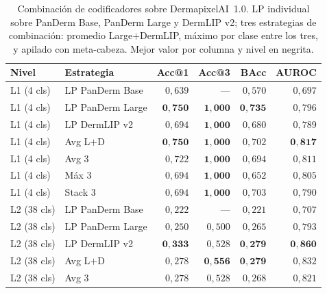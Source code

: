 \begin{table}[htbp]
\centering
\footnotesize
\setlength{\tabcolsep}{4pt}
\renewcommand{\arraystretch}{0.95}
\caption{Combinación de codificadores sobre DermapixelAI~1.0. LP
individual sobre PanDerm Base, PanDerm Large y DermLIP v2; tres
estrategias de combinación: promedio Large$+$DermLIP, máximo por
clase entre los tres, y apilado con meta-cabeza. Mejor valor por
columna y nivel en negrita.}
\label{tab:dermapixel-ensemble}
\begin{tabular}{llrrrr}
\hline
Nivel & Estrategia                         & Acc@1              & Acc@3              & BAcc               & AUROC \\
\hline
L1 (4 cls)   & LP PanDerm Base             & $0{,}639$          & ---                & $0{,}570$          & $0{,}697$ \\
L1 (4 cls)   & LP PanDerm Large            & $\mathbf{0{,}750}$ & $\mathbf{1{,}000}$ & $\mathbf{0{,}735}$ & $0{,}796$ \\
L1 (4 cls)   & LP DermLIP v2               & $0{,}694$          & $\mathbf{1{,}000}$ & $0{,}680$          & $0{,}789$ \\
L1 (4 cls)   & Avg L$+$D                   & $\mathbf{0{,}750}$ & $\mathbf{1{,}000}$ & $0{,}702$          & $\mathbf{0{,}817}$ \\
L1 (4 cls)   & Avg 3                       & $0{,}722$          & $\mathbf{1{,}000}$ & $0{,}694$          & $0{,}811$ \\
L1 (4 cls)   & Máx 3                       & $0{,}694$          & $\mathbf{1{,}000}$ & $0{,}652$          & $0{,}805$ \\
L1 (4 cls)   & Stack 3                     & $0{,}694$          & $\mathbf{1{,}000}$ & $0{,}703$          & $0{,}790$ \\
\hline
L2 (38 cls)  & LP PanDerm Base             & $0{,}222$          & ---                & $0{,}221$          & $0{,}707$ \\
L2 (38 cls)  & LP PanDerm Large            & $0{,}250$          & $0{,}500$          & $0{,}265$          & $0{,}793$ \\
L2 (38 cls)  & LP DermLIP v2               & $\mathbf{0{,}333}$ & $0{,}528$          & $\mathbf{0{,}279}$ & $\mathbf{0{,}860}$ \\
L2 (38 cls)  & Avg L$+$D                   & $0{,}278$          & $\mathbf{0{,}556}$ & $\mathbf{0{,}279}$ & $0{,}832$ \\
L2 (38 cls)  & Avg 3                       & $0{,}278$          & $0{,}528$          & $0{,}268$          & $0{,}821$ \\

\end{tabular}
\end{table}
